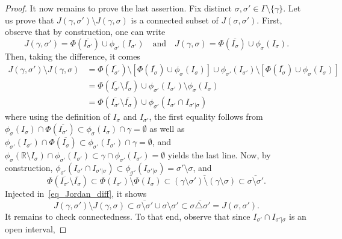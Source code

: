 \documentclass[a4paper, 11pt]{article} %
\theoremstyle{plain}
\newcommand{\R}{\mathbb{R}}
\newcommand{\1}{\mathds 1}
\numberwithin{equation}{section}
\begin{document}
\begin{proof}
    It now remains to prove the last assertion. Fix distinct $\sigma,\sigma'\in\Gamma\setminus\{\gamma\}$. Let us prove that $J(\gamma,\sigma')\setminus J(\gamma,\sigma)$ is a connected subset of $J(\sigma,\sigma')$. First, observe that by construction, one can write
        \[J(\gamma,\sigma')=\Phi(\overline{I_{\sigma'}})\cup \phi_{\sigma'}(I_{\sigma'})\quad\text{and}\quad J(\gamma,\sigma)=\Phi(\overline{I_{\sigma}})\cup \phi_{\sigma}(I_{\sigma}).\]
    Then, taking the difference, it comes
        \begin{equation}
            \label{eq_Jordan_diff}
            \begin{split}
                J(\gamma,\sigma')\setminus J(\gamma,\sigma)&=\Phi(\overline{I_{\sigma'}})\setminus[\Phi(\overline{I_{\sigma}})\cup \phi_{\sigma}(I_{\sigma})]\cup\phi_{\sigma'}(I_{\sigma'})\setminus[\Phi(\overline{I_\sigma})\cup\phi_{\sigma}(I_{\sigma})]\\
                &=\Phi(\overline{{I_{\sigma'}}}\setminus\overline{I_\sigma})\cup\phi_{\sigma'}(I_{\sigma'})\setminus\phi_{\sigma}(I_{\sigma})\\
                &=\Phi(\overline{{I_{\sigma'}}}\setminus\overline{I_\sigma})\cup\phi_{\sigma'}(I_{\sigma'}\cap I_{\sigma'|\sigma})
            \end{split}
        \end{equation}
    where using the definition of $I_\sigma$ and $I_{\sigma'}$, the first equality follows from $\phi_\sigma(I_\sigma)\cap\Phi(\overline{I_{\sigma'}})\subset\phi_\sigma(I_\sigma)\cap\gamma=\emptyset$ as well as $\phi_{\sigma'}(I_{\sigma'})\cap\Phi(\overline{I_\sigma})\subset\phi_{\sigma'}(I_{\sigma'})\cap\gamma=\emptyset$, and $\phi_\sigma(\R\setminus I_{\sigma})\cap\phi_{\sigma'}(I_{\sigma'})\subset\gamma\cap\phi_{\sigma'}(I_{\sigma'})=\emptyset$ yields the last line. Now, by construction, $\phi_{\sigma'}(I_{\sigma'}\cap I_{\sigma'|\sigma})\subset\phi_{\sigma'}(I_{\sigma'|\sigma})=\sigma'\setminus\sigma$, and
        \[\Phi(\overline{{I_{\sigma'}}}\setminus\overline{I_\sigma})\subset\overline{\Phi(I_{\sigma'})\setminus\Phi(I_\sigma)}\subset\overline{(\gamma\setminus\sigma')\setminus(\gamma\setminus\sigma)}\subset\overline{\sigma\setminus\sigma'}.\]
    Injected in~\eqref{eq_Jordan_diff}, it shows
        \[J(\gamma,\sigma')\setminus J(\gamma,\sigma)\subset\overline{\sigma\setminus\sigma'}\cup\sigma\setminus\sigma'\subset \overline{\sigma\triangle\sigma'}=J(\sigma,\sigma').\]
    It remains to check connectedness. To that end, observe that since $I_{\sigma'}\cap I_{\sigma'|\sigma}$ is an open interval,

\end{proof}
\end{document}
